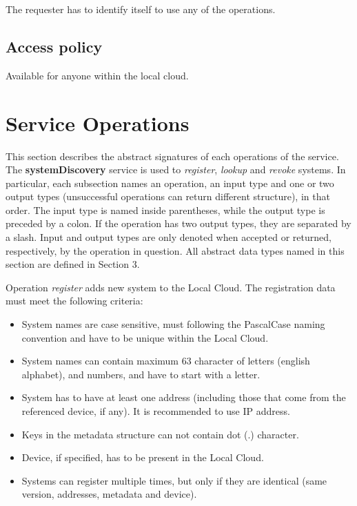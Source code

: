 \documentclass[a4paper]{arrowhead}
\begin{document}
The requester has to identify itself to use any of the operations.

\subsection{Access policy}
\label{sec:accesspolicy}

Available for anyone within the local cloud.

\newpage

\section{Service Operations}
\label{sec:functions}

This section describes the abstract signatures of each operations of the service. The \textbf{systemDiscovery} service is used to \textit{register}, \textit{lookup} and \textit{revoke} systems.
In particular, each subsection names an operation, an input type and one or two output types (unsuccessful operations can return different structure), in that order.
The input type is named inside parentheses, while the output type is preceded by a colon. If the operation has two output types, they are separated by a slash.
Input and output types are only denoted when accepted or returned, respectively, by the operation in question. All abstract data types named in this section are defined in Section 3.

{}

Operation \textit{register} adds new system to the Local Cloud. The registration data must meet the following criteria:

\begin{itemize}
    \item System names are case sensitive, must following the PascalCase naming
convention and have to be unique within the Local Cloud.
    \item System names can contain maximum 63 character of letters (english alphabet), and numbers, and have to start with a letter.
    \item System has to have at least one address (including those that come from the referenced device, if any). It is recommended to use IP address. 
    \item Keys in the metadata structure can not contain dot (.) character.
    \item Device, if specified, has to be present in the Local Cloud.
    \item Systems can register multiple times, but only if they are identical (same version, addresses, metadata and device).
\end{itemize}
\end{document}

